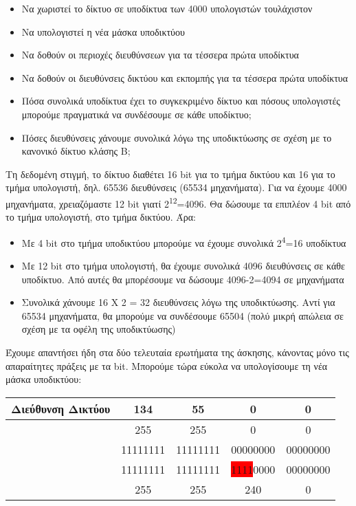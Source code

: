 \begin{itemize}
\item Να χωριστεί το δίκτυο σε υποδίκτυα των 4000 υπολογιστών τουλάχιστον
\item Να υπολογιστεί η νέα μάσκα υποδικτύου
\item Να δοθούν οι περιοχές διευθύνσεων για τα τέσσερα πρώτα υποδίκτυα
\item Να δοθούν οι διευθύνσεις δικτύου και εκπομπής για τα τέσσερα πρώτα υποδίκτυα
\item Πόσα συνολικά υποδίκτυα έχει το συγκεκριμένο δίκτυο και πόσους υπολογιστές μπορούμε πραγματικά να συνδέσουμε σε κάθε υποδίκτυο;
\item Πόσες διευθύνσεις χάνουμε συνολικά λόγω της υποδικτύωσης σε σχέση με το κανονικό δίκτυο κλάσης B;  
\end{itemize}

Τη δεδομένη στιγμή, το δίκτυο διαθέτει 16 bit για το τμήμα δικτύου και 16 για το τμήμα υπολογιστή, δηλ. 65536 διευθύνσεις (65534 μηχανήματα). Για να έχουμε 4000 μηχανήματα, χρειαζόμαστε 12 bit γιατί 2\textsuperscript{12}=4096. Θα δώσουμε τα επιπλέον 4 bit από το τμήμα υπολογιστή, στο τμήμα δικτύου. Άρα:

\begin{itemize}
\item Με 4 bit στο τμήμα υποδικτύου μπορούμε να έχουμε συνολικά 2\textsuperscript{4}=16 υποδίκτυα
\item Με 12 bit στο τμήμα υπολογιστή, θα έχουμε συνολικά 4096 διευθύνσεις σε κάθε υποδίκτυο. Από αυτές θα μπορέσουμε να δώσουμε 4096-2=4094 σε μηχανήματα
\item Συνολικά χάνουμε 16 Χ 2 = 32 διευθύνσεις λόγω της υποδικτύωσης. Αντί για 65534 μηχανήματα, θα μπορούμε να συνδέσουμε 65504 (πολύ μικρή απώλεια σε σχέση με τα οφέλη της υποδικτύωσης)
\end{itemize}

Έχουμε απαντήσει ήδη στα δύο τελευταία ερωτήματα της άσκησης, κάνοντας μόνο τις απαραίτητες πράξεις με τα bit. Μπορούμε τώρα εύκολα να υπολογίσουμε τη νέα μάσκα υποδικτύου:

\begin{center}
\fontsize{11}{13}
\ttfamily
\begin{tabular}{|c|c|c|c|c|}
\hline
 \textbf{Διεύθυνση Δικτύου} & 134 & 55 & 0 & 0 \\ 
\hline
\multirow{2}{*}{} \textbf{Παλιά Μάσκα} & 255 & 255 & 0  & 0 \\ 
\cline{2-5} 
              \textbf{Δικτύου} & 11111111  & 11111111 & 00000000 & 00000000 \\ 
\hline
\multirow{2}{*}{} \textbf{Νέα Μάσκα} & 11111111 & 11111111 & \colorbox{red}{1111}0000 & 00000000  \\ 
\cline{2-5} 
             \textbf{Υποδικτύου} & 255 & 255 & 240 & 0 \\ 
\hline
\end{tabular}
\normalfont
\end{center}

